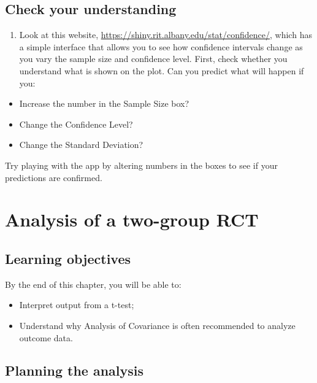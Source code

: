 \documentclass{krantz}
\providecommand{\tightlist}{%
\setlength{\itemsep}{0pt}\setlength{\parskip}{0pt}}
\begin{document}
\hypertarget{check-your-understanding-10}{%
\section{Check your understanding}\label{check-your-understanding-10}}

\begin{enumerate}
\def\labelenumi{\arabic{enumi}.}
\tightlist
\item
  Look at this website, \url{https://shiny.rit.albany.edu/stat/confidence/}, which has a simple interface that allows you to see how confidence intervals change as you vary the sample size and confidence level. First, check whether you understand what is shown on the plot. Can you predict what will happen if you:
\end{enumerate}

\begin{itemize}
\tightlist
\item
  Increase the number in the Sample Size box?\\
\item
  Change the Confidence Level?\\
\item
  Change the Standard Deviation?
\end{itemize}

Try playing with the app by altering numbers in the boxes to see if your predictions are confirmed.

\hypertarget{analysis}{%
\chapter{Analysis of a two-group RCT}\label{analysis}}

\hypertarget{learning-objectives-10}{%
\section{Learning objectives}\label{learning-objectives-10}}

By the end of this chapter, you will be able to:

\begin{itemize}
\tightlist
\item
  Interpret output from a t-test;
\item
  Understand why Analysis of Covariance is often recommended to analyze outcome data.
\end{itemize}

\hypertarget{planning-the-analysis}{%
\section{Planning the analysis}\label{planning-the-analysis}}
\end{document}
